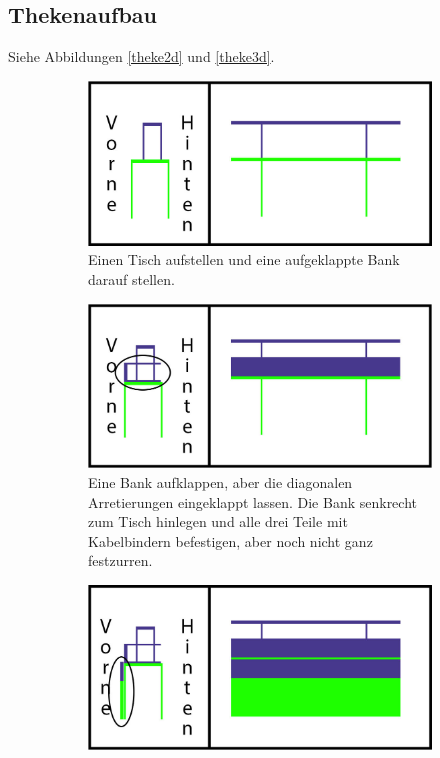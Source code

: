 \subsection{Thekenaufbau}
Siehe Abbildungen \ref{theke2d} und \ref{theke3d}.
\begin{figure}[h]
  \centering
  \begin{subfigure}[t]{0.45\textwidth}
    \includegraphics[width=\textwidth]{2d_1.png}
    \caption{Einen Tisch aufstellen und eine aufgeklappte Bank darauf stellen.}
  \end{subfigure}
  \hfill
  \begin{subfigure}[t]{0.45\textwidth}
    \includegraphics[width=\textwidth]{2d_2.png}
    \caption{Eine Bank aufklappen, aber die diagonalen Arretierungen eingeklappt lassen. Die Bank senkrecht zum Tisch hinlegen und alle drei Teile mit Kabelbindern befestigen, aber noch nicht ganz festzurren.}
  \end{subfigure}
  \centering
  \begin{subfigure}[t]{0.45\textwidth}
    \includegraphics[width=\textwidth]{2d_3.png}

\end{subfigure}
\end{figure}

